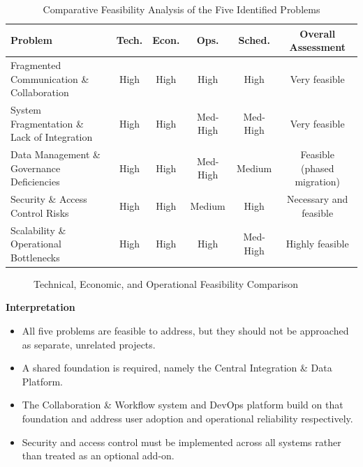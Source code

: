 \documentclass[12pt,a4paper]{report}
\begin{document}
\begin{table}[H]
\centering
\renewcommand{\arraystretch}{1.4}
\small
\begin{tabularx}{\textwidth}{|>{\raggedright\arraybackslash}X|c|c|c|c|c|}
\hline
\rowcolor{secondary}
\textbf{Problem} & \textbf{Tech.} & \textbf{Econ.} & \textbf{Ops.} & \textbf{Sched.} & \textbf{Overall Assessment} \\
\hline
Fragmented Communication \& Collaboration & High & High & High & High & Very feasible \\
\hline
System Fragmentation \& Lack of Integration & High & High & Med-High & Med-High & Very feasible \\
\hline
Data Management \& Governance Deficiencies & High & High & Med-High & Medium & Feasible (phased migration) \\
\hline
Security \& Access Control Risks & High & High & Medium & High & Necessary and feasible \\
\hline
Scalability \& Operational Bottlenecks & High & High & High & Med-High & Highly feasible \\
\hline
\end{tabularx}
\caption{Comparative Feasibility Analysis of the Five Identified Problems}
\end{table}

\begin{figure}[H]
\centering
{}
\caption{Technical, Economic, and Operational Feasibility Comparison}
\end{figure}

\textbf{Interpretation}
\begin{itemize}[leftmargin=2em]
    \item All five problems are feasible to address, but they should not be approached as separate, unrelated projects.
    \item A shared foundation is required, namely the Central Integration \& Data Platform.
    \item The Collaboration \& Workflow system and DevOps platform build on that foundation and address user adoption and operational reliability respectively.
    \item Security and access control must be implemented across all systems rather than treated as an optional add-on.
\end{itemize}
\end{document}
